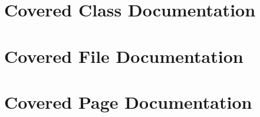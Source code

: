 \documentclass[a4paper]{book}
\begin{document}
\chapter{Covered Class Documentation}





























\chapter{Covered File Documentation}





































































\chapter{Covered Page Documentation}










\printindex
\end{document}
